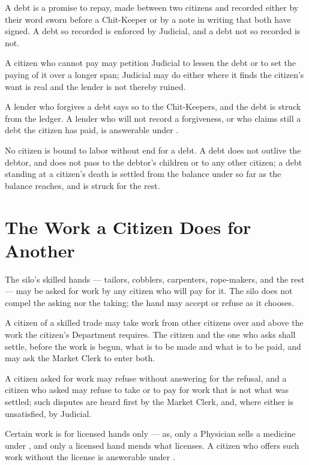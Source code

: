 \begin{clauses}
\item A debt is a promise to repay, made between two citizens and recorded either by their word sworn before a Chit-Keeper or by a note in writing that both have signed. A debt so recorded is enforced by Judicial, and a debt not so recorded is not.
\item A citizen who cannot pay may petition Judicial to lessen the debt or to set the paying of it over a longer span; Judicial may do either where it finds the citizen's want is real and the lender is not thereby ruined.
\item A lender who forgives a debt says so to the Chit-Keepers, and the debt is struck from the ledger. A lender who will not record a forgiveness, or who claims still a debt the citizen has paid, is answerable under .
\item No citizen is bound to labor without end for a debt. A debt does not outlive the debtor, and does not pass to the debtor's children or to any other citizen; a debt standing at a citizen's death is settled from the balance under  so far as the balance reaches, and is struck for the rest.
\end{clauses}

\section{The Work a Citizen Does for Another}
\label{sec:commerce:work-a-citizen-does-for-another}

The silo's skilled hands --- tailors, cobblers, carpenters, rope-makers, and the rest --- may be asked for work by any citizen who will pay for it. The silo does not compel the asking nor the taking; the hand may accept or refuse as it chooses.

\begin{clauses}
\item A citizen of a skilled trade may take work from other citizens over and above the work the citizen's Department requires. The citizen and the one who asks shall settle, before the work is begun, what is to be made and what is to be paid, and may ask the Market Clerk to enter both.
\item A citizen asked for work may refuse without answering for the refusal, and a citizen who asked may refuse to take or to pay for work that is not what was settled; such disputes are heard first by the Market Clerk, and, where either is unsatisfied, by Judicial.
\item Certain work is for licensed hands only --- as, only a Physician sells a medicine under , and only a licensed hand mends what  licenses. A citizen who offers such work without the license is answerable under .
\end{clauses}

